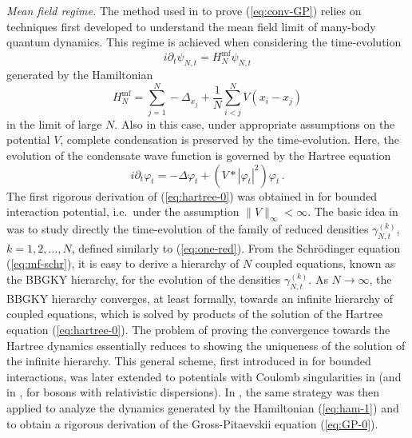 \documentclass[11pt,a4paper]{article}
\begin{document}
\bigskip

{\it Mean field regime.} The method used in \cite{ESY0,ESY1,ESY2,ESY3,ESY4} 
to prove (\ref{eq:conv-GP}) relies on techniques first developed to understand the mean field limit of many-body quantum dynamics. This regime is achieved when considering the time-evolution 
\begin{equation}\label{eq:mf-schr}
i\partial_t \psi_{N,t} = H_N^{\text{mf}} \psi_{N,t} 
\end{equation}
generated by the Hamiltonian
\begin{equation}\label{eq:ham-mf} H_N^{\text{mf}} = \sum_{j=1}^N -\Delta_{x_j} + \frac{1}{N} \sum_{i<j}^N V (x_i -x_j) \end{equation}
in the limit of large $N$. Also in this case, under appropriate assumptions on the potential $V$, 
complete condensation is preserved by the time-evolution. Here, the evolution of the condensate wave function is governed by the Hartree equation
\begin{equation}\label{eq:hartree-0} i\partial_t \varphi_t = -\Delta \varphi_t + \left( V * |\varphi_t|^2\right) \varphi_t \,. \end{equation}
The first rigorous derivation of (\ref{eq:hartree-0}) was obtained in \cite{S} for bounded interaction potential, i.e.\ under the assumption $\| V \|_\infty < \infty$. The basic idea in \cite{S} was to study directly the time-evolution of the family of reduced densities $\gamma^{(k)}_{N,t}$, $k =1 ,2, \dots , N$, defined similarly to (\ref{eq:one-red}).  {F}rom the Schr\"odinger equation (\ref{eq:mf-schr}), it is easy to derive a hierarchy of $N$ coupled equations, known as the BBGKY hierarchy, for the evolution of the densities $\gamma^{(k)}_{N,t}$. As $N \to \infty$, the BBGKY hierarchy converges, at least formally, towards an infinite hierarchy of coupled equations, which is solved by products of the solution of the Hartree equation (\ref{eq:hartree-0}). The problem of proving the convergence towards the Hartree dynamics essentially reduces to showing the uniqueness of the solution of the infinite hierarchy. This general scheme, first introduced in \cite{S} for bounded interactions, was later extended to 
potentials with Coulomb singularities in \cite{EY} (and in \cite{ES}, for bosons with relativistic dispersions). In \cite{ESY1,ESY2,ESY3,ESY4}, the same strategy was then applied to analyze the dynamics generated by the Hamiltonian (\ref{eq:ham-1}) and to obtain a rigorous derivation of the Gross-Pitaevskii equation (\ref{eq:GP-0}). 
\end{document}
